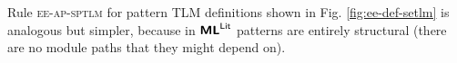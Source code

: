 \documentclass[acmsmall,screen]{acmart}
\begin{document}
Rule \textsc{ee-ap-sptlm} for pattern TLM definitions shown in Fig. \ref{fig:ee-def-setlm} is analogous but simpler, because in $\textsf{\textbf{ML}}^\textsf{Lit}$ patterns are entirely structural (there are no module paths that they might depend on). %

\end{document}
